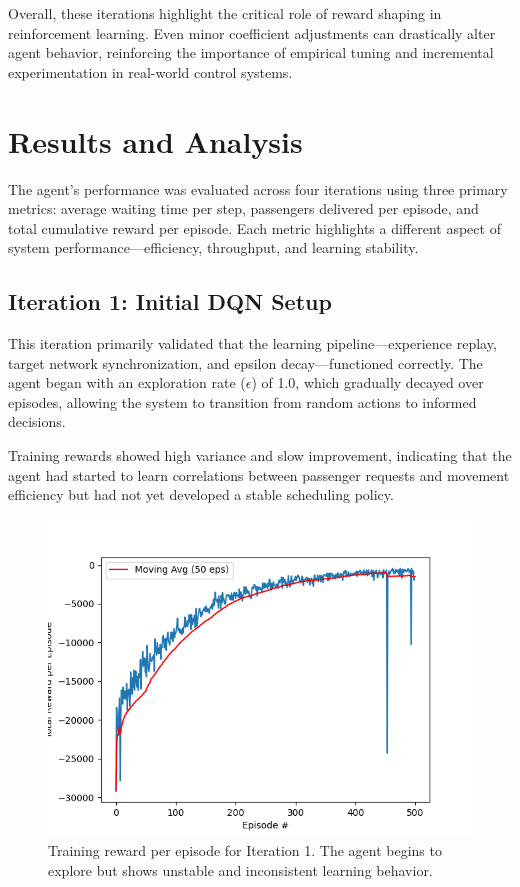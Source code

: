 \documentclass[conference]{IEEEtran}
\begin{document}
Overall, these iterations highlight the critical role of reward shaping in reinforcement learning. Even minor coefficient adjustments can drastically alter agent behavior, reinforcing the importance of empirical tuning and incremental experimentation in real-world control systems.


\section{Results and Analysis}
The agent’s performance was evaluated across four iterations using three primary metrics: average waiting time per step, passengers delivered per episode, and total cumulative reward per episode. Each metric highlights a different aspect of system performance—efficiency, throughput, and learning stability.

\subsection{Iteration 1: Initial DQN Setup}

This iteration primarily validated that the learning pipeline—experience replay, target network synchronization, and epsilon decay—functioned correctly. The agent began with an exploration rate ($\epsilon$) of 1.0, which gradually decayed over episodes, allowing the system to transition from random actions to informed decisions.

Training rewards showed high variance and slow improvement, indicating that the agent had started to learn correlations between passenger requests and movement efficiency but had not yet developed a stable scheduling policy.

\begin{figure}[H]
\centering
\includegraphics[width=\columnwidth]{1_total_reward_per_episode.png}
\caption{Training reward per episode for Iteration 1. The agent begins to explore but shows unstable and inconsistent learning behavior.}
\label{fig:iter1}
\end{figure}
\end{document}
